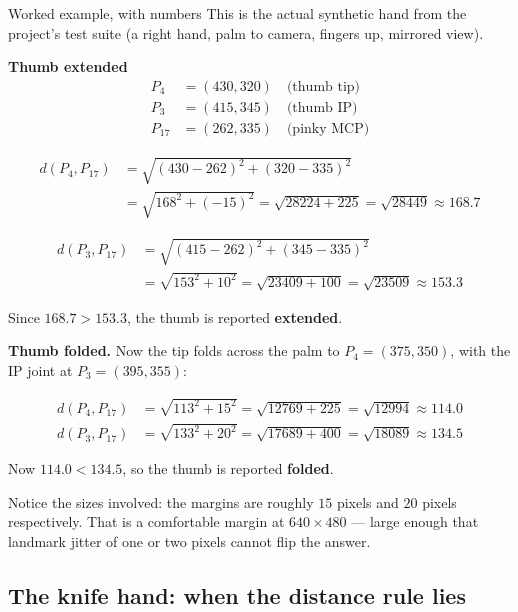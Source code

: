 \begin{mathdeepdive}{Worked example, with numbers}
This is the actual synthetic hand from the project's test suite (a right hand, palm to camera,
fingers up, mirrored view).

\textbf{Thumb extended}
\begin{align*}
P_4 &= (430, 320) \quad \text{(thumb tip)} \\
P_3 &= (415, 345) \quad \text{(thumb IP)} \\
P_{17} &= (262, 335) \quad \text{(pinky MCP)}
\end{align*}

\begin{align*}
d(P_4, P_{17}) &= \sqrt{(430-262)^2 + (320-335)^2} \\
               &= \sqrt{168^2 + (-15)^2} = \sqrt{28224 + 225} = \sqrt{28449} \approx 168.7
\end{align*}

\begin{align*}
d(P_3, P_{17}) &= \sqrt{(415-262)^2 + (345-335)^2} \\
               &= \sqrt{153^2 + 10^2} = \sqrt{23409 + 100} = \sqrt{23509} \approx 153.3
\end{align*}

Since $168.7 > 153.3$, the thumb is reported \textbf{extended}. \checkmark

\textbf{Thumb folded.} Now the tip folds across the palm to $P_4 = (375, 350)$, with the IP joint at
$P_3 = (395, 355)$:

\begin{align*}
d(P_4, P_{17}) &= \sqrt{113^2 + 15^2} = \sqrt{12769+225} = \sqrt{12994} \approx 114.0 \\
d(P_3, P_{17}) &= \sqrt{133^2 + 20^2} = \sqrt{17689+400} = \sqrt{18089} \approx 134.5
\end{align*}

Now $114.0 < 134.5$, so the thumb is reported \textbf{folded}. \checkmark

Notice the sizes involved: the margins are roughly $15$ pixels and $20$ pixels respectively. That is
a comfortable margin at $640 \times 480$ --- large enough that landmark jitter of one or two pixels
cannot flip the answer.
\end{mathdeepdive}

\subsection{The knife hand: when the distance rule lies}

